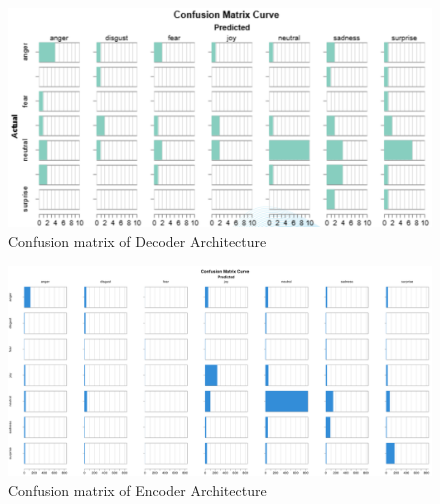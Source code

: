\documentclass{article}
\begin{document}
\begin{figure}[hbtp]
  \centering
  \includegraphics[width=0.8\linewidth]{Images/decoder_confusion_matrix.png}
  \caption{Confusion matrix of Decoder Architecture}
  \label{fig:dec_confusion_matrix}
\end{figure}

\begin{figure}[hbtp]
  \centering
  \includegraphics[width=0.8\linewidth]{Images/encoder_confusion_matrix.png}
  \caption{Confusion matrix of Encoder Architecture}
  \label{fig:enc_confusion_matrix}
\end{figure}
\end{document}

